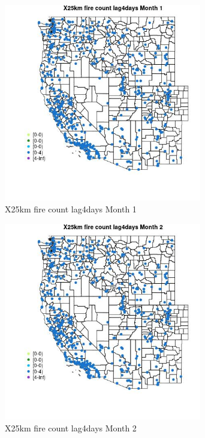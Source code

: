 \begin{figure} 
\centering  
\includegraphics[width=0.77\textwidth]{Code_Outputs/Report_ML_input_PM25_Step4_part_e_de_duplicated_aves_compiled_2019-05-14wNAs_MapObsMo1X25km_fire_count_lag4days.jpg} 
\caption{\label{fig:Report_ML_input_PM25_Step4_part_e_de_duplicated_aves_compiled_2019-05-14wNAsMapObsMo1X25km_fire_count_lag4days}X25km fire count lag4days Month 1} 
\end{figure} 
 

\begin{figure} 
\centering  
\includegraphics[width=0.77\textwidth]{Code_Outputs/Report_ML_input_PM25_Step4_part_e_de_duplicated_aves_compiled_2019-05-14wNAs_MapObsMo2X25km_fire_count_lag4days.jpg} 
\caption{\label{fig:Report_ML_input_PM25_Step4_part_e_de_duplicated_aves_compiled_2019-05-14wNAsMapObsMo2X25km_fire_count_lag4days}X25km fire count lag4days Month 2} 
\end{figure} 
 

